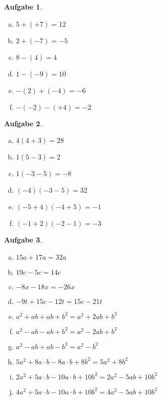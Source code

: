 \documentclass[12pt,fleqn]{article}
\theoremstyle{aufg}
\newtheorem{aufgabe}{Aufgabe}
\theoremstyle{bsp}
\begin{document}
 
    \begin{flushleft}
\begin{aufgabe} ~ \\ 
\begin{multicols}{3} 
\begin{enumerate}[a)] 
\item 
$5+(+7)=12$
\item 
$2+(-7)=-5$
\item 
$8-(4)=4$
\item 
$1-(-9)=10$
\item 
$-(2)+(-4)=-6$
\item 
$-(-2)-(+4)=-2$
\end{enumerate} 
\end{multicols} 
\end{aufgabe} 
\begin{aufgabe} ~ \\ 
\begin{multicols}{3} 
\begin{enumerate}[a)] 
\item 
$4(4+3)=28$
\item 
$1(5-3)=2$
\item 
$1(-3-5)=-8$
\item 
$(-4)(-3-5)=32$
\item 
$(-5+4)(-4+5)=-1$
\item 
$(-1+2)(-2-1)=-3$
\end{enumerate} 
\end{multicols} 
\end{aufgabe} 
\begin{aufgabe} ~ \\ 
\begin{multicols}{2} 
\begin{enumerate}[a)] 
\item 
$15a+17a=32 a$
\item 
$19c-5c=14 c$
\item 
$-8x-18x=- 26 x$
\item 
$-9t+15c-12t=15 c - 21 t$
\item 
$a^2+ab+ab+b^2=a^{2} + 2 a b + b^{2}$
\item 
$a^2-ab-ab+b^2=a^{2} - 2 a b + b^{2}$
\item 
$a^2-ab+ab-b^2=a^{2} - b^{2}$
\item 
$5a^2+8a\cdot b-8a\cdot b+8b^2=5 a^{2} + 8 b^{2}$
\item 
$2a^2+5a\cdot b-10a\cdot b+10b^2=2 a^{2} - 5 a b + 10 b^{2}$
\item 
$4a^2+5a\cdot b-10a\cdot b+10b^2=4 a^{2} - 5 a b + 10 b^{2}$

\end{enumerate}
\end{multicols}
\end{aufgabe}
\end{flushleft}
\end{document}
